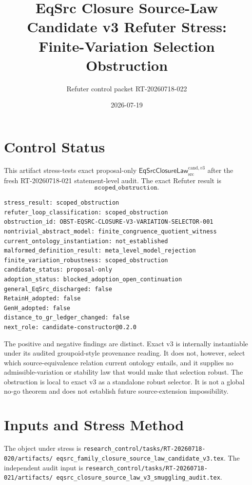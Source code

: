 \documentclass[11pt]{article}
\title{EqSrc Closure Source-Law Candidate v3 Refuter Stress:\\
Finite-Variation Selection Obstruction}
\author{Refuter control packet RT-20260718-022}
\date{2026-07-19}
\newcommand{\Law}{\mathsf{EqSrcClosureLaw}^{\mathrm{cand},v3}_{\mathrm{src}}}
\begin{document}
\maketitle

\section{Control Status}

This artifact stress-tests exact proposal-only \(\Law\) after the fresh
RT-20260718-021 statement-level audit. The exact Refuter result is
\[
  \boxed{\texttt{scoped\_obstruction}}.
\]

\begin{verbatim}
stress_result: scoped_obstruction
refuter_loop_classification: scoped_obstruction
obstruction_id: OBST-EQSRC-CLOSURE-V3-VARIATION-SELECTOR-001
nontrivial_abstract_model: finite_congruence_quotient_witness
current_ontology_instantiation: not_established
malformed_definition_result: meta_level_model_rejection
finite_variation_robustness: scoped_obstruction
candidate_status: proposal-only
adoption_status: blocked_adoption_open_continuation
general_EqSrc_discharged: false
RetainH_adopted: false
GenH_adopted: false
distance_to_gr_ledger_changed: false
next_role: candidate-constructor@0.2.0
\end{verbatim}

The positive and negative findings are distinct. Exact v3 is internally
instantiable under its audited groupoid-style provenance reading. It does not,
however, select which source-equivalence relation current ontology entails,
and it supplies no admissible-variation or stability law that would make that
selection robust. The obstruction is local to exact v3 as a standalone robust
selector. It is not a global no-go theorem and does not establish future
source-extension impossibility.

\section{Inputs and Stress Method}

The object under stress is
\texttt{research\_control/tasks/RT-20260718-020/artifacts/
eqsrc\_family\_closure\_source\_law\_candidate\_v3.tex}.
The independent audit input is
\texttt{research\_control/tasks/RT-20260718-021/artifacts/
eqsrc\_closure\_source\_law\_v3\_smuggling\_audit.tex}.
\end{document}
